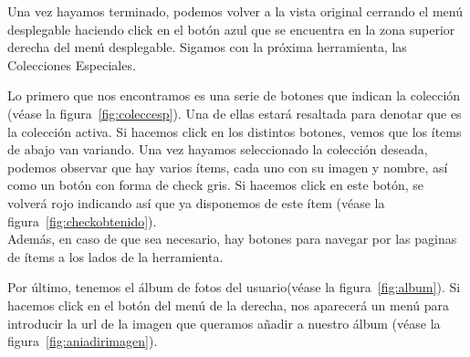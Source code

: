 \clearpage

Una vez hayamos terminado, podemos volver a la vista original cerrando el menú desplegable haciendo click en el botón azul que se encuentra en la zona superior derecha del menú desplegable. Sigamos con la próxima herramienta, las Colecciones Especiales.\\


Lo primero que nos encontramos es una serie de botones que indican la colección {(v\'ease la figura~\ref{fig:coleccesp})}. Una de ellas estará resaltada para denotar que es la colección activa. Si hacemos click en los distintos botones, vemos que los ítems de abajo van variando. Una vez hayamos seleccionado la colección deseada, podemos observar que hay varios ítems, cada uno con su imagen y nombre, así como un botón con forma de check gris. Si hacemos click en este botón, se volverá rojo indicando así que ya disponemos de este ítem {(v\'ease la figura~\ref{fig:checkobtenido})}.\\

Además, en caso de que sea necesario, hay botones para navegar por las paginas de ítems a los lados de la herramienta.\\


\clearpage

Por último, tenemos el álbum de fotos del usuario{(v\'ease la figura~\ref{fig:album})}. Si hacemos click en el botón del menú de la derecha, nos aparecerá un menú para introducir la url de la imagen que queramos añadir a nuestro álbum {(v\'ease la figura~\ref{fig:aniadirimagen})}.\\

